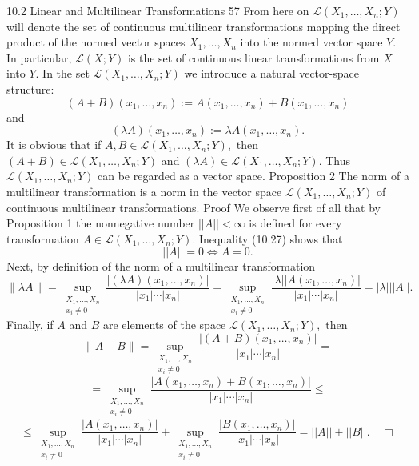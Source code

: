 10.2 Linear and Multilinear Transformations
57
From here on $\mathcal{L}(X_1, \ldots, X_n; Y)$ will denote the set of continuous multilinear
transformations mapping the direct product of the normed vector spaces $X_1, \ldots, X_n$
into the normed vector space $Y.$
In particular, $\mathcal{L}(X; Y)$ is the set of continuous linear transformations from $X$
into $Y.$
In the set $\mathcal{L}(X_1, \ldots, X_n; Y)$ we introduce a natural vector-space structure:
$$(A + B)(x_1,\ldots, x_n) := A(x_1,\ldots,x_n) + B(x_1,\ldots,x_n)$$
and
$$(\lambda A)(x_1,\ldots,x_n) := \lambda A(x_1,\ldots,x_n).$$
It is obvious that if $A, B \in \mathcal{L}(X_1, \ldots, X_n; Y),$ then $(A + B) \in \mathcal{L}(X_1, \ldots, X_n; Y)$
and $(\lambda A) \in \mathcal{L}(X_1, \ldots, X_n; Y).$
Thus $\mathcal{L}(X_1,\ldots, X_n; Y)$ can be regarded as a vector space.
Proposition 2 The norm of a multilinear transformation is a norm in the vector
space $\mathcal{L}(X_1,\ldots, X_n; Y)$ of continuous multilinear transformations.
Proof We observe first of all that by Proposition 1 the nonnegative number $||A|| < \infty$
is defined for every transformation $A \in \mathcal{L}(X_1, \ldots, X_n; Y).$
Inequality (10.27) shows that
$$||A|| = 0 \iff A = 0.$$
Next, by definition of the norm of a multilinear transformation
$$\|\lambda A\| = \sup_{\substack{X_1,\ldots, X_n \\ x_i \ne 0}} \frac{|(\lambda A)(x_1,\ldots,x_n)|}{|x_1|\cdots|x_n|} = \sup_{\substack{X_1,\ldots, X_n \\ x_i \ne 0}} \frac{|\lambda||A(x_1,\ldots,x_n)|}{|x_1|\cdots|x_n|} = |\lambda| ||A||.$$
Finally, if $A$ and $B$ are elements of the space $\mathcal{L}(X_1, \ldots, X_n; Y),$ then
$$\|A + B \| = \sup_{\substack{X_1,\ldots, X_n \\ x_i \ne 0}} \frac{|(A + B)(x_1,\ldots,x_n)|}{|x_1|\cdots|x_n|} =$$
$$= \sup_{\substack{X_1,\ldots, X_n \\ x_i \ne 0}} \frac{|A(x_1,\ldots,x_n) + B(x_1,\ldots,x_n)|}{|x_1|\cdots|x_n|} \le$$
$$\le \sup_{\substack{X_1,\ldots, X_n \\ x_i \ne 0}} \frac{|A(x_1,\ldots,x_n)|}{|x_1|\cdots|x_n|} + \sup_{\substack{X_1,\ldots, X_n \\ x_i \ne 0}} \frac{|B(x_1,\ldots,x_n)|}{|x_1|\cdots|x_n|} = ||A|| + || B || . \quad \Box$$